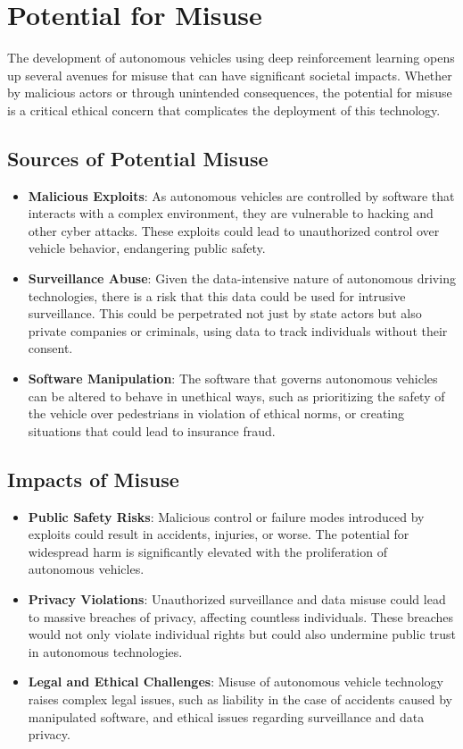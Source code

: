 \documentclass[10pt,twocolumn]{article}
\begin{document}
\section{Potential for Misuse}
    The development of autonomous vehicles using deep reinforcement learning opens up several avenues for misuse that can have significant societal impacts. Whether by malicious actors or through unintended consequences, the potential for misuse is a critical ethical concern that complicates the deployment of this technology\cite{AVCyberAttacks}.

\subsection{Sources of Potential Misuse}
    \begin{itemize}
        \item \textbf{Malicious Exploits}: As autonomous vehicles are controlled by software that interacts with a complex environment, they are vulnerable to hacking and other cyber attacks. These exploits could lead to unauthorized control over vehicle behavior, endangering public safety.
        \item \textbf{Surveillance Abuse}: Given the data-intensive nature of autonomous driving technologies, there is a risk that this data could be used for intrusive surveillance. This could be perpetrated not just by state actors but also private companies or criminals, using data to track individuals without their consent.
        \item \textbf{Software Manipulation}: The software that governs autonomous vehicles can be altered to behave in unethical ways, such as prioritizing the safety of the vehicle over pedestrians in violation of ethical norms, or creating situations that could lead to insurance fraud.
    \end{itemize}

\subsection{Impacts of Misuse}
    \begin{itemize}
        \item \textbf{Public Safety Risks}: Malicious control or failure modes introduced by exploits could result in accidents, injuries, or worse. The potential for widespread harm is significantly elevated with the proliferation of autonomous vehicles.
        \item \textbf{Privacy Violations}: Unauthorized surveillance and data misuse could lead to massive breaches of privacy, affecting countless individuals. These breaches would not only violate individual rights but could also undermine public trust in autonomous technologies.
        \item \textbf{Legal and Ethical Challenges}: Misuse of autonomous vehicle technology raises complex legal issues, such as liability in the case of accidents caused by manipulated software, and ethical issues regarding surveillance and data privacy.
    \end{itemize}
\end{document}
